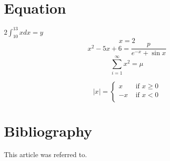 \documentclass[14pt, a4paper]{article}
\begin{document}
\section{Equation}
    $ 2 \int_{10}^{13} x dx = y $
    $$ x=2 $$
\begin{equation}
    x^2 - 5x + 6 = \frac{p}{e^{-x} + \sin{x}}
\end{equation}
\begin{equation}
    \sum_{i=1}^{\infty} x^2 = \mu
\end{equation}

\begin{equation}
    |x| = \begin{cases}
            x & \text{ if } x \geq 0 \\
            -x & \text{ if } x < 0 \\
          \end{cases}
\end{equation}

\section {Bibliography}
This article was referred to. \cite{sarma2009some}

\printbibliography
\end{document}

